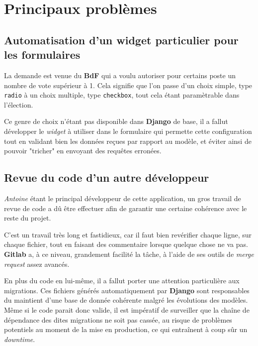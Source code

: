 \documentclass[a4paper]{report}
\begin{document}
\section{Principaux problèmes}
\label{sec:principaux_problemes}

\subsection{Automatisation d'un widget particulier pour les formulaires}
\label{sub:automatisation_d_un_widget_particulier_pour_les_formulaires}
\par La demande est venue du \textbf{BdF} qui a voulu autoriser pour certains poste un nombre de vote supérieur à 1.
Cela signifie que l'on passe d'un choix simple, type \verb#radio# à un choix multiple, type \verb#checkbox#, tout cela
étant paramètrable dans l'élection.

\par Ce genre de choix n'étant pas disponible dans \textbf{Django} de base, il a fallut développer le \emph{widget} à
utiliser dans le formulaire qui permette cette configuration tout en validant bien les données reçues par rapport au
modèle, et éviter ainsi de pouvoir "tricher" en envoyant des requêtes erronées.

\subsection{Revue du code d'un autre développeur}
\label{sub:revue_du_code_d_un_autre_developpeur}
\par \emph{Antoine} étant le principal développeur de cette application, un gros travail de revue de code a dû être
effectuer afin de garantir une certaine cohérence avec le reste du projet.

\par C'est un travail très long et fastidieux, car il faut bien revérifier chaque ligne, sur chaque fichier, tout en
faisant des commentaire lorsque quelque chose ne va pas. \textbf{Gitlab} a, à ce niveau, grandement facilité la tâche, à
l'aide de ses outils de \emph{merge request} assez avancés.

\par En plus du code en lui-même, il a fallut porter une attention particulière aux migrations. Ces fichiers générés
automatiquement par \textbf{Django} sont responsables du maintient d'une base de donnée cohérente malgré les évolutions
des modèles. Même si le code parait donc valide, il est impératif de surveiller que la chaîne de dépendance des dites
migrations ne soit pas cassée, au risque de problèmes potentiels au moment de la mise en production, ce qui entraînent à
coup sûr un \emph{downtime}.
\end{document}
